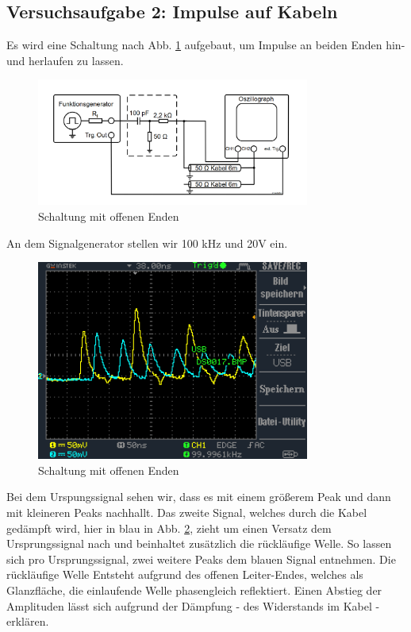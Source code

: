 \documentclass[a4paper,12pt,twocoloumn]{article}
\numberwithin{equation}{section}
\begin{document}
\subsection{Versuchsaufgabe 2: Impulse auf Kabeln}
Es wird eine Schaltung nach Abb. \ref{fig:2.1} aufgebaut, um Impulse an beiden Enden hin- und herlaufen zu lassen.
\begin{figure}[h]
        \centering
        \includegraphics[width=0.8\textwidth]{Schaltung_offen.png}
        \caption{Schaltung mit offenen Enden}
		\label{fig:2.1}
\end{figure}
An dem Signalgenerator stellen wir 100 kHz und 20V ein.
\begin{figure}[h]
        \centering
        \includegraphics[width=0.8\textwidth]{data/DS0017.BMP.png}
        \caption{Schaltung mit offenen Enden}
		\label{fig:2.2}
\end{figure}
Bei dem Urspungssignal sehen wir, dass es mit einem größerem Peak und dann mit kleineren Peaks nachhallt. Das zweite Signal, welches durch die Kabel gedämpft wird, hier in blau in Abb. \ref{fig:2.2}, zieht um einen Versatz dem Ursprungssignal nach und beinhaltet zusätzlich die rückläufige Welle. So lassen sich pro Ursprungssignal, zwei weitere Peaks dem blauen Signal entnehmen. Die rückläufige Welle Entsteht aufgrund des offenen Leiter-Endes, welches als Glanzfläche, die einlaufende Welle phasengleich reflektiert. Einen Abstieg der Amplituden lässt sich aufgrund der Dämpfung - des Widerstands im Kabel - erklären.
\end{document}
